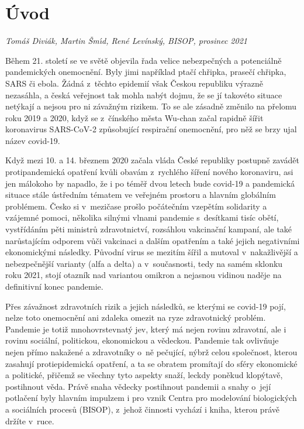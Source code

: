 \chapter*{Úvod}

\textit{Tomáš Diviák, Martin \v Sm\'\i d, René Levínský, BISOP, prosinec 2021}
\vspace{15mm}

\noindent Během 21. století se ve světě objevila řada velice nebezpečných a potenciálně pandemických onemocnění. Byly jimi například ptačí chřipka, prasečí chřipka, SARS či ebola. Žádná z~těchto epidemií však Českou republiku výrazně nezasáhla, a česká veřejnost tak mohla nabýt dojmu, že se jí takovéto situace netýkají a nejsou pro ni závažným rizikem. To se ale zásadně změnilo na přelomu roku 2019 a 2020, když se z~čínského města Wu-chan začal rapidně šířit koronavirus SARS-CoV-2 způsobující respirační onemocnění, pro něž se brzy ujal název covid-19.

Když mezi 10. a 14. březnem 2020 začala vláda České republiky postupně zavádět protipandemická opatření kvůli obavám z~rychlého šíření nového koronaviru, asi jen málokoho by napadlo, že i po téměř dvou letech bude covid-19 a pandemická situace stále ústředním tématem ve veřejném prostoru a hlavním globálním problémem. Česko si v~mezičase prošlo počátečním vzepětím solidarity a vzájemné pomoci, několika silnými vlnami pandemie s~desítkami tisíc obětí, vystřídáním pěti ministrů zdravotnictví, rozsáhlou vakcinační kampaní, ale také narůstajícím odporem vůči vakcinaci a dalším opatřením a také jejich negativními ekonomickými následky. Původní virus se mezitím šířil a mutoval v~nakažlivější a nebezpečnější varianty (alfa a delta) a v~současnosti, tedy na samém sklonku roku 2021, stojí otazník nad variantou omikron a nejasnou vidinou naděje na definitivní konec pandemie.

Přes závažnost zdravotních rizik a jejich následků, se kterými se covid-19 pojí, nelze toto onemocnění ani zdaleka omezit na ryze zdravotnický problém. Pandemie je totiž mnohovrstevnatý jev, který má nejen rovinu zdravotní, ale i rovinu sociální, politickou, ekonomickou a vědeckou. Pandemie tak ovlivňuje nejen přímo nakažené a zdravotníky o~ně pečující, nýbrž celou společnost, kterou zasahují protiepidemická opatření, a ta se obratem promítají do sféry ekonomické a politické, přičemž se všechny tyto aspekty snaží, leckdy poněkud klopýtavě, postihnout věda. \newpage Právě snaha vědecky postihnout pandemii a snahy o~její potlačení byly hlavním impulzem i pro vznik Centra pro modelování biologických a sociálních procesů (BISOP), z~jehož činnosti vychází i kniha, kterou právě držíte v~ruce.

